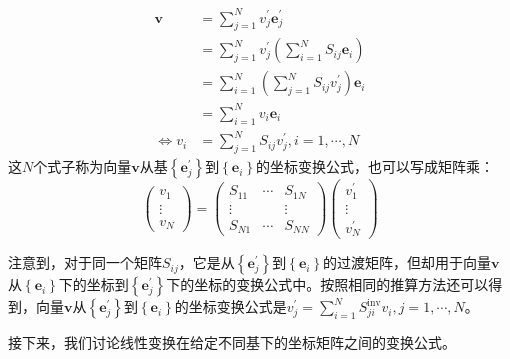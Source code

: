 \documentclass[main.tex]{subfiles}
\begin{document}
\begin{align*}
\mathbf{v}&=\sum_{j=1}^Nv^\prime_j\mathbf{e}^\prime_j\\
&=\sum_{j=1}^Nv^\prime_j\left(\sum_{i=1}^NS_{ij}\mathbf{e}_i\right)\\
&=\sum_{i=1}^N\left(\sum_{j=1}^N S_{ij}v^\prime_j\right)\mathbf{e}_i\\
&=\sum_{i=1}^Nv_i\mathbf{e}_i\\
\Leftrightarrow v_i&=\sum_{j=1}^NS_{ij}v^\prime_j,i=1,\cdots,N
\end{align*}
这$N$个式子称为向量$\mathbf{v}$从基$\left\{\mathbf{e}^\prime_j\right\}$到$\left\{\mathbf{e}_i\right\}$的坐标变换公式，也可以写成矩阵乘：
\[\left(\begin{array}{c}v_1\\\vdots\\v_N\end{array}\right)=\left(\begin{array}{ccc}S_{11}&\cdots&S_{1N}\\\vdots&&\vdots\\S_{N1}&\cdots&S_{NN}\end{array}\right)\left(\begin{array}{c}v^\prime_1\\\vdots\\v^\prime_N\end{array}\right)\]

注意到，对于同一个矩阵$S_{ij}$，它是从$\left\{\mathbf{e}^\prime_j\right\}$到$\left\{\mathbf{e}_i\right\}$的过渡矩阵，但却用于向量$\mathbf{v}$从$\left\{\mathbf{e}_i\right\}$下的坐标到$\left\{\mathbf{e}^\prime_j\right\}$下的坐标的变换公式中。按照相同的推算方法还可以得到，向量$\mathbf{v}$从$\left\{\mathbf{e}^\prime_j\right\}$到$\left\{\mathbf{e}_i\right\}$的坐标变换公式是$v^\prime_j=\sum_{i=1}^NS^\mathrm{inv}_{ji}v_i,j=1,\cdots,N$。

接下来，我们讨论线性变换在给定不同基下的坐标矩阵之间的变换公式。
\end{document}
